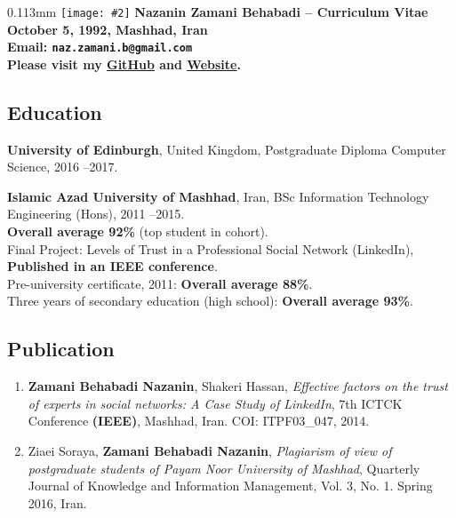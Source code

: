 \documentclass[10pt]{article}
\newcommand{\imagetext}[3][0.11]{%
\begin{imagetextbox}[]{#1\textwidth}{3mm}%
  \texttt{[image: \#2]}%
  \tcblower%
   #3%
\end{imagetextbox}}
\begin{document}
\imagetext{1.jpg}{\Large\bf Nazanin Zamani Behabadi -- \textcolor{ green!50!red}{Curriculum Vitae} \\ \normalsize October 5, 1992, Mashhad, Iran \\ \normalsize Email: \texttt{naz.zamani.b@gmail.com}\\ \small{Please visit my \href{https://github.com/Nazzamani}{\underline{GitHub}} and \href{https://nazzamani.github.io}{\underline{Website}}.}}
\thispagestyle{empty}

\subsection*{Education}
\noindent \textbf{University of Edinburgh}, United Kingdom, Postgraduate Diploma Computer Science, 2016 --2017.

\noindent \textbf{Islamic Azad University of Mashhad}, Iran, BSc Information Technology Engineering (Hons), 2011 --2015. \\
\indent \textbf{Overall average 92\%} (top student in cohort).\\
\indent Final Project: Levels of Trust in a Professional Social Network (LinkedIn), \textbf {Published in an IEEE conference}.\\
\noindent Pre-university certificate, 2011: \textbf{Overall average  88\%}. \\
\noindent Three years of secondary education (high school): \textbf{Overall average  93\%}.
\subsection*{Publication}
\begin{enumerate}
\item \textbf{Zamani Behabadi Nazanin}, Shakeri Hassan, \textit{Effective factors on the trust of experts in social networks: A Case Study of LinkedIn}, 7th ICTCK Conference\textbf{ (IEEE)}, Mashhad, Iran. COI:  ITPF03\_047, 2014.
\item Ziaei Soraya, \textbf{Zamani Behabadi Nazanin}, \textit{Plagiarism of view of postgraduate students of Payam Noor University of Mashhad}, Quarterly Journal of Knowledge and Information Management, Vol. 3, No. 1. Spring 2016, Iran.
\end{enumerate}
\end{document}
